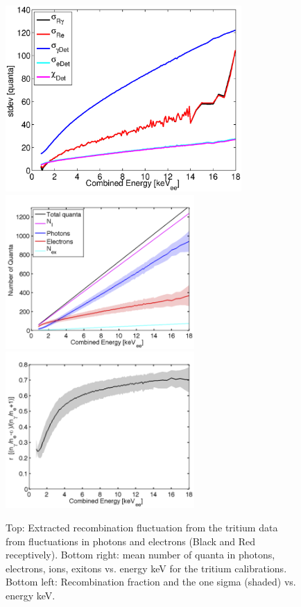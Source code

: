  \begin{figure}[p!]\centering
 \includegraphics[width=90mm]{Chapter_Flucs/Figures/Iter0/std_fig_.eps}
 \includegraphics[width=72mm]{Chapter_Flucs/Figures/Iter0/quanta_LY_QY_0.png}
 \includegraphics[width=72mm]{Chapter_Flucs/Figures/Iter0/R_LY_QY_0.png}
\caption{Top: Extracted recombination fluctuation from the tritium data from fluctuations in photons and electrons (Black and Red receptively). Bottom right: mean number of quanta in photons, electrons, ions, exitons vs. energy keV for the tritium calibrations. Bottom left: Recombination fraction and the one sigma (shaded) vs. energy keV.}
\label{fig:Rec_0}
\end{figure}

